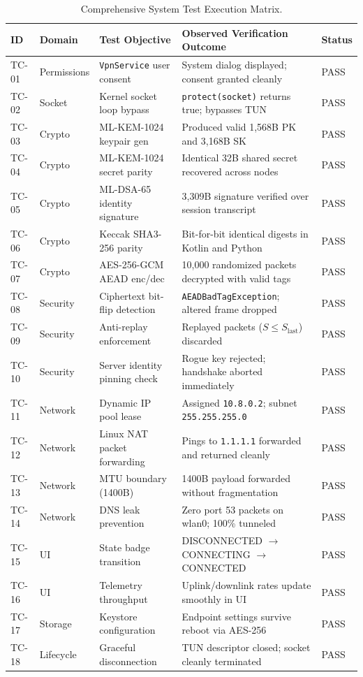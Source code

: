 \begin{table}[htbp]
  \centering
  \scriptsize
  \setlength{\tabcolsep}{2.5pt}
  \caption{Comprehensive System Test Execution Matrix.}
  \label{tab:test_execution_matrix}
  \begin{tabularx}{\linewidth}{@{}p{1.1cm}p{1.6cm}p{3.8cm}Yp{1.1cm}@{}}
    \toprule
    \textbf{ID} & \textbf{Domain} & \textbf{Test Objective} & \textbf{Observed Verification Outcome} & \textbf{Status} \\
    \midrule
    TC-01 & Permissions & \texttt{VpnService} user consent & System dialog displayed; consent granted cleanly & PASS \\
    TC-02 & Socket & Kernel socket loop bypass & \texttt{protect(socket)} returns true; bypasses TUN & PASS \\
    TC-03 & Crypto & ML-KEM-1024 keypair gen & Produced valid 1,568B PK and 3,168B SK & PASS \\
    TC-04 & Crypto & ML-KEM-1024 secret parity & Identical 32B shared secret recovered across nodes & PASS \\
    TC-05 & Crypto & ML-DSA-65 identity signature & 3,309B signature verified over session transcript & PASS \\
    TC-06 & Crypto & Keccak SHA3-256 parity & Bit-for-bit identical digests in Kotlin and Python & PASS \\
    TC-07 & Crypto & AES-256-GCM AEAD enc/dec & 10,000 randomized packets decrypted with valid tags & PASS \\
    TC-08 & Security & Ciphertext bit-flip detection & \texttt{AEADBad}\allowbreak\texttt{TagException}; altered frame dropped & PASS \\
    TC-09 & Security & Anti-replay enforcement & Replayed packets ($S \le S_{\text{last}}$) discarded & PASS \\
    TC-10 & Security & Server identity pinning check & Rogue key rejected; handshake aborted immediately & PASS \\
    TC-11 & Network & Dynamic IP pool lease & Assigned \texttt{10.8.0.2}; subnet \texttt{255.255.255.0} & PASS \\
    TC-12 & Network & Linux NAT packet forwarding & Pings to \texttt{1.1.1.1} forwarded and returned cleanly & PASS \\
    TC-13 & Network & MTU boundary (1400B) & 1400B payload forwarded without fragmentation & PASS \\
    TC-14 & Network & DNS leak prevention & Zero port 53 packets on wlan0; 100\% tunneled & PASS \\
    TC-15 & UI & State badge transition & DISCONNECTED $\to$ CONNECTING $\to$ CONNECTED & PASS \\
    TC-16 & UI & Telemetry throughput & Uplink/downlink rates update smoothly in UI & PASS \\
    TC-17 & Storage & Keystore configuration & Endpoint settings survive reboot via AES-256 & PASS \\
    TC-18 & Lifecycle & Graceful disconnection & TUN descriptor closed; socket cleanly terminated & PASS \\
    \bottomrule
  \end{tabularx}
\end{table}

